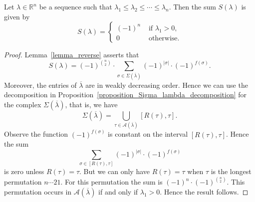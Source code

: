 \documentclass[ALCO,ThmDefs,Unicode,epreuves]{cedram}
\newcommand{\Rrr}{\mathbb{R}}
\newcommand{\lambdaweaklyincreasing}
{\lambda_{1} \leq \lambda_{2} \leq \cdots \leq \lambda_{n}}
\begin{document}
\begin{prop}
Let $\lambda \in \Rrr^{n}$ be a sequence such that
$\lambdaweaklyincreasing$.
Then the sum $S(\lambda)$ is given by
$$
S(\lambda)
=
\begin{cases}
(-1)^{n} & \text{ if } \lambda_{1} > 0, \\
0 & \text{ otherwise.}
\end{cases}
$$ 
\label{proposition_S_lambda_increasing}
\end{prop}
\begin{proof}
Lemma~\ref{lemma_reverse}
asserts that
$$
S(\lambda)
=
(-1)^{\binom{n}{2}}
\cdot
\sum_{\sigma\in\Sigma(\overline{\lambda})}
(-1)^{|\sigma|} \cdot (-1)^{f(\sigma)}.
$$
Moreover,
the entries of 
$\overline{\lambda}$
are in weakly decreasing order.
Hence we can use
the decomposition
in Proposition~\ref{proposition_Sigma_lambda_decomposition}
for the complex 
$\Sigma(\overline{\lambda})$,
that is, we have
$$
\Sigma(\overline{\lambda})
=
\bigcup_{\tau \in \mathcal{A}(\overline{\lambda})} [R(\tau), \tau] .
$$
Observe the function
$(-1)^{f(\sigma)}$
is constant on the interval
$[R(\tau), \tau]$.
Hence the sum
$$ \sum_{\sigma \in [R(\tau), \tau]} (-1)^{|\sigma|} \cdot (-1)^{f(\sigma)} $$
is zero unless $R(\tau) = \tau$.
But we can only have $R(\tau)=\tau$
when $\tau$ is the longest permutation
$n \cdots 21$. For this permutation
the sum is $(-1)^{n} \cdot (-1)^{\binom{n}{2}}$.
This permutation occurs in $\mathcal{A}(\overline{\lambda})$
if and only if $\lambda_{1} > 0$.
Hence the result follows.
\end{proof}
\end{document}
